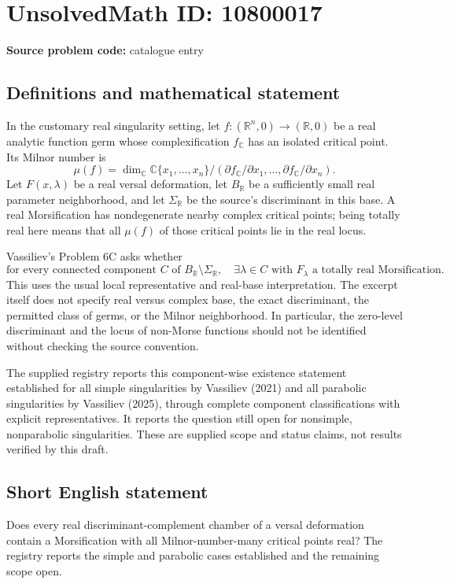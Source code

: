 \documentclass[11pt]{article}
\newcommand{\R}{\mathbb{R}}
\newcommand{\C}{\mathbb{C}}
\begin{document}
\section*{UnsolvedMath ID: 10800017}
\textbf{Source problem code:} catalogue entry
\subsection{Definitions and mathematical statement}
In the customary real singularity setting, let $f:(\R^n,0)\to(\R,0)$ be a real analytic function germ whose complexification $f_{\C}$ has an isolated critical point. Its Milnor number is
\[
 \mu(f)=\dim_{\C}
 \C\{x_1,\ldots,x_n\}/
 (\partial f_{\C}/\partial x_1,\ldots,\partial f_{\C}/\partial x_n).
\]
Let $F(x,\lambda)$ be a real versal deformation, let $B_{\R}$ be a sufficiently small real parameter neighborhood, and let $\Sigma_{\R}$ be the source's discriminant in this base. A real Morsification has nondegenerate nearby complex critical points; being totally real here means that all $\mu(f)$ of those critical points lie in the real locus.

Vassiliev's Problem 6C asks whether
\[
 \text{for every connected component }C\text{ of }B_{\R}\setminus\Sigma_{\R},
 \quad\exists\lambda\in C
 \text{ with }F_\lambda\text{ a totally real Morsification}.
\]
This uses the usual local representative and real-base interpretation. The excerpt itself does not specify real versus complex base, the exact discriminant, the permitted class of germs, or the Milnor neighborhood. In particular, the zero-level discriminant and the locus of non-Morse functions should not be identified without checking the source convention.

The supplied registry reports this component-wise existence statement established for all simple singularities by Vassiliev (2021) and all parabolic singularities by Vassiliev (2025), through complete component classifications with explicit representatives. It reports the question still open for nonsimple, nonparabolic singularities. These are supplied scope and status claims, not results verified by this draft.
\subsection{Short English statement}
Does every real discriminant-complement chamber of a versal deformation contain a Morsification with all Milnor-number-many critical points real? The registry reports the simple and parabolic cases established and the remaining scope open.
\end{document}
